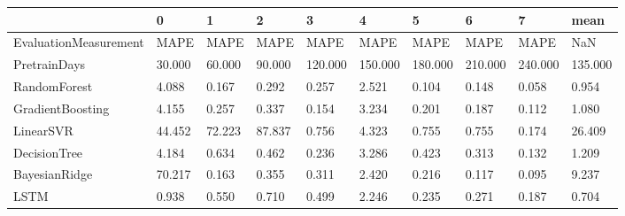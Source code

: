 \begin{tabular}{llllllllll}
\toprule
{} &      0 &      1 &      2 &       3 &       4 &       5 &       6 &       7 &    mean \\
\midrule
EvaluationMeasurement &   MAPE &   MAPE &   MAPE &    MAPE &    MAPE &    MAPE &    MAPE &    MAPE &     NaN \\
PretrainDays          & 30.000 & 60.000 & 90.000 & 120.000 & 150.000 & 180.000 & 210.000 & 240.000 & 135.000 \\
RandomForest          &  4.088 &  0.167 &  0.292 &   0.257 &   2.521 &   0.104 &   0.148 &   0.058 &   0.954 \\
GradientBoosting      &  4.155 &  0.257 &  0.337 &   0.154 &   3.234 &   0.201 &   0.187 &   0.112 &   1.080 \\
LinearSVR             & 44.452 & 72.223 & 87.837 &   0.756 &   4.323 &   0.755 &   0.755 &   0.174 &  26.409 \\
DecisionTree          &  4.184 &  0.634 &  0.462 &   0.236 &   3.286 &   0.423 &   0.313 &   0.132 &   1.209 \\
BayesianRidge         & 70.217 &  0.163 &  0.355 &   0.311 &   2.420 &   0.216 &   0.117 &   0.095 &   9.237 \\
LSTM                  &  0.938 &  0.550 &  0.710 &   0.499 &   2.246 &   0.235 &   0.271 &   0.187 &   0.704 \\
\bottomrule
\end{tabular}
